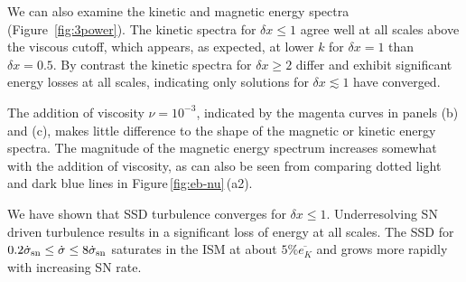 \documentclass[preprint2]{aastex63}
\newcommand\SNr{\dot\sigma_{\rm sn}}
\newcommand\dx{ {\delta x}}
\begin{document}
 We can also examine the
      {kinetic and magnetic}
   energy spectra (Figure~\ref{fig:3power}).
   The kinetic spectra
   for $\dx\leq1$ agree well at 
 all scales above the viscous cutoff, which appears, as expected, at lower $k$ for
 $\dx=1$ than $\dx=0.5$.
 By contrast the kinetic spectra for $\dx\geq2$ differ and exhibit significant
 energy losses at all scales,    
 indicating only solutions for $\dx\lesssim1$ have converged.

 {The addition of viscosity $\nu=10^{-3}$, indicated by the magenta curves in
 panels (b) and (c), {makes little difference to the shape of the
   magnetic or kinetic energy spectra.  The magnitude of the magnetic
   energy spectrum increases somewhat with the addition of viscosity,
   as can also be seen from comparing dotted light and dark blue
   lines in Figure\,\ref{fig:eb-nu}\,(a2).}
   }

 {We have shown that SSD turbulence {converges} for $\dx\leq1$.
 Underresolving SN driven turbulence results in a significant loss of energy
 at all scales. {The}
 SSD for $0.2\SNr\leq \dot\sigma \leq 8\SNr$ saturates in the ISM at about
 $5\%\overline{e_K}$ and grows more rapidly with increasing SN rate.
 } 
\end{document}
